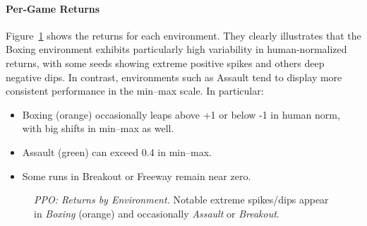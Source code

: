 \paragraph{Per‐Game Returns}
Figure~\ref{fig:ppo_returns_pergame} shows the returns for each environment. They clearly illustrates that the Boxing environment exhibits particularly high variability in human-normalized returns, with some seeds showing extreme positive spikes and others deep negative dips. In contrast, environments such as Assault tend to display more consistent performance in the min--max scale. In particular:
\begin{itemize}
	\item Boxing (orange) occasionally leaps above +1 or below -1 in human norm,
	with big shifts in min--max as well.
	\item Assault (green) can exceed 0.4 in min--max.
	\item Some runs in Breakout or Freeway remain near zero.
\end{itemize}

\begin{figure} 
	\centering
	\quad
	\caption{\emph{PPO: Returns by Environment.} 
		Notable extreme spikes/dips appear in \emph{Boxing} (orange) 
		and occasionally \emph{Assault} or \emph{Breakout}.}
	\label{fig:ppo_returns_pergame}
\end{figure}

